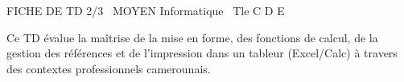 \documentclass[11pt]{article}
\begin{document}
\begin{tcolorbox}[enhanced,colback=popink,colframe=popink,arc=10pt,boxrule=0pt,left=12pt,right=12pt,top=9pt,bottom=9pt]
{\color{white}\popxbold\small FICHE DE TD 2/3 \textbullet\ MOYEN \hfill Informatique \textbullet\ Tle C D E\par}
\end{tcolorbox}
\vspace{4pt}
\noindent Ce TD évalue la maîtrise de la mise en forme, des fonctions de calcul, de la gestion des références et de l'impression dans un tableur (Excel/Calc) à travers des contextes professionnels camerounais.
\end{document}
